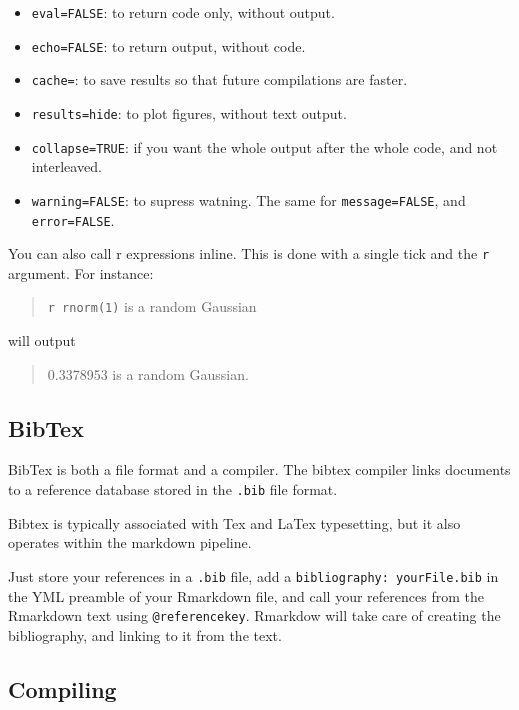 \documentclass[]{book}
\providecommand{\tightlist}{%
  \setlength{\itemsep}{0pt}\setlength{\parskip}{0pt}}
\theoremstyle{definition}
\theoremstyle{definition}
\theoremstyle{definition}
\theoremstyle{remark}
\begin{document}
\begin{itemize}
\tightlist
\item
  \texttt{eval=FALSE}: to return code only, without output.
\item
  \texttt{echo=FALSE}: to return output, without code.
\item
  \texttt{cache=}: to save results so that future compilations are faster.
\item
  \texttt{results=\textquotesingle{}hide\textquotesingle{}}: to plot figures, without text output.
\item
  \texttt{collapse=TRUE}: if you want the whole output after the whole code, and not interleaved.
\item
  \texttt{warning=FALSE}: to supress watning. The same for \texttt{message=FALSE}, and \texttt{error=FALSE}.
\end{itemize}

You can also call r expressions inline.
This is done with a single tick and the \texttt{r} argument.
For instance:

\begin{quote}
\texttt{\textasciigrave{}r\ rnorm(1)\textasciigrave{}} is a random Gaussian
\end{quote}

will output

\begin{quote}
0.3378953 is a random Gaussian.
\end{quote}

\hypertarget{bibtex}{%
\subsection{BibTex}\label{bibtex}}

BibTex is both a file format and a compiler. The bibtex compiler links documents to a reference database stored in the \texttt{.bib} file format.

Bibtex is typically associated with Tex and LaTex typesetting, but it also operates within the markdown pipeline.

Just store your references in a \texttt{.bib} file, add a \texttt{bibliography:\ yourFile.bib} in the YML preamble of your Rmarkdown file, and call your references from the Rmarkdown text using \texttt{@referencekey}.
Rmarkdow will take care of creating the bibliography, and linking to it from the text.

\hypertarget{compiling}{%
\subsection{Compiling}\label{compiling}}
\end{document}
